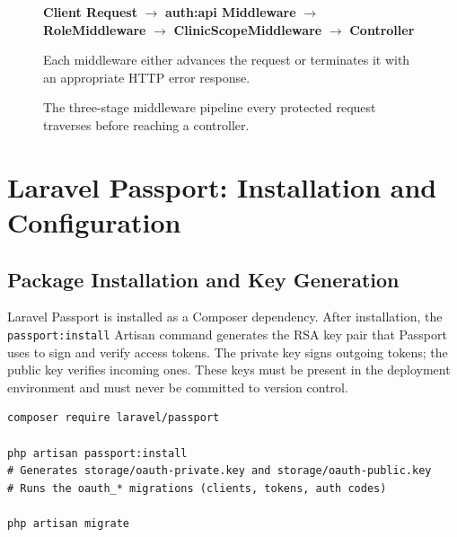 \begin{figure}[h!]
  \centering
  \begin{tcolorbox}[
    enhanced, arc=4pt, boxrule=1pt,
    colback=LightGray, colframe=RuleGray,
    left=12pt, right=12pt, top=10pt, bottom=10pt,
    width=\linewidth,
  ]
  \centering
  \textbf{Client Request}
  \quad\textcolor{AccentTeal}{$\longrightarrow$}\quad
  \textcolor{PrimaryBlue}{\textbf{auth:api Middleware}}
  \quad\textcolor{AccentTeal}{$\longrightarrow$}\quad
  \textcolor{PrimaryBlue}{\textbf{RoleMiddleware}}
  \quad\textcolor{AccentTeal}{$\longrightarrow$}\quad
  \textcolor{PrimaryBlue}{\textbf{ClinicScopeMiddleware}}
  \quad\textcolor{AccentTeal}{$\longrightarrow$}\quad
  \textcolor{MethodPost}{\textbf{Controller}}

  \vspace{6pt}
  \small
  Each middleware either advances the request or terminates it with an
  appropriate HTTP error response.
  \end{tcolorbox}
  \caption{The three-stage middleware pipeline every protected request
    traverses before reaching a controller.}
  \label{fig:middleware-pipeline}
\end{figure}

\section{Laravel Passport: Installation and Configuration}
\label{sec:passport-setup}

\subsection{Package Installation and Key Generation}

Laravel Passport is installed as a Composer dependency. After
installation, the \texttt{passport:install} Artisan command generates
the RSA key pair that Passport uses to sign and verify access tokens.
The private key signs outgoing tokens; the public key verifies incoming
ones. These keys must be present in the deployment environment and must
never be committed to version control.

\begin{lstlisting}[style=bash, caption={Installing Passport and generating
  encryption keys.}]
composer require laravel/passport

php artisan passport:install
# Generates storage/oauth-private.key and storage/oauth-public.key
# Runs the oauth_* migrations (clients, tokens, auth codes)

php artisan migrate
\end{lstlisting}

